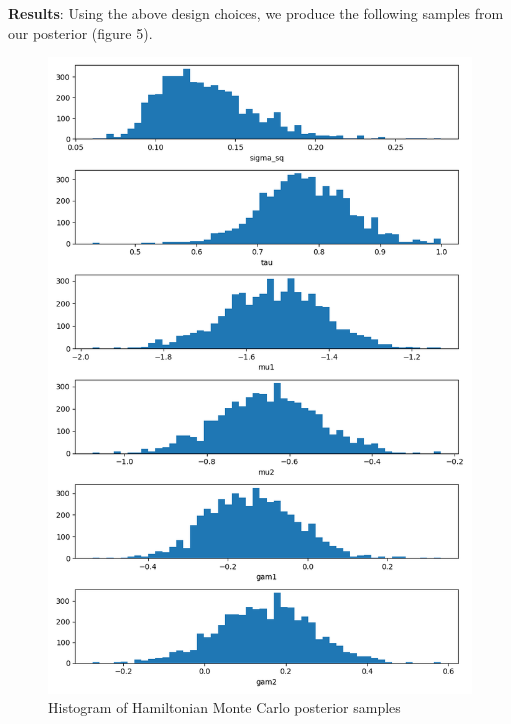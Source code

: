 \documentclass[12pt,letterpaper,twoside]{article}
\begin{document}
\textbf{Results}: Using the above design choices, we produce the following 
samples from our posterior (figure 5).
\begin{figure}[H]
    \centering
    \includegraphics[scale=0.7]{gibbs_sampled_histogram.png}
    \caption{Histogram of Hamiltonian Monte Carlo posterior samples}
\end{figure}
\end{document}

